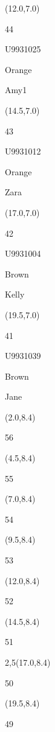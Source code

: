 \documentclass[a4paper]{article}
\newcommand{\myseat}[4]{%
\vspace{-0.1cm} \hspace{-0.5cm}
\parbox[t][2.2cm][t]{3.5cm}{%
\small #1 %
\begin{description}
\vspace{-0.1cm}
\item [ID:] #2
\vspace{-0.1cm}
\item [Team:] #3 \normalsize
\vspace{-0.1cm}
\item \normalsize #4
\vspace{-0.1cm}
\end{description}
}
}
\begin{document}
\begin{textblock}{2.5}(12.0,7.0)
\myseat{44}{U9931025}{Orange}{Amy1}
\end{textblock}

\begin{textblock}{2.5}(14.5,7.0)
\myseat{43}{U9931012}{Orange}{Zara}
\end{textblock}

\begin{textblock}{2.5}(17.0,7.0)
\myseat{42}{U9931004}{Brown}{Kelly}
\end{textblock}

\begin{textblock}{2.5}(19.5,7.0)
\myseat{41}{U9931039}{Brown}{Jane}
\end{textblock}


\begin{textblock}{2.5}(2.0,8.4)
\textblockcolor{}
\myseat{56}{}{}{}
\end{textblock}

\begin{textblock}{2.5}(4.5,8.4)
\textblockcolor{}
\myseat{55}{}{}{}
\end{textblock}

\begin{textblock}{2.5}(7.0,8.4)
\textblockcolor{}
\myseat{54}{}{}{}
\end{textblock}

\begin{textblock}{2.5}(9.5,8.4)
\textblockcolor{}
\myseat{53}{}{}{}
\end{textblock}

\begin{textblock}{2.5}(12.0,8.4)
\textblockcolor{}
\myseat{52}{}{}{}
\end{textblock}

\begin{textblock}{2.5}(14.5,8.4)
\textblockcolor{}
\myseat{51}{}{}{}
\end{textblock}

\begin{textblock}{2,5}(17.0,8.4)
\textblockcolor{}
\myseat{50}{}{}{}
\end{textblock}

\begin{textblock}{2.5}(19.5,8.4)
\textblockcolor{}
\myseat{49}{}{}{}
\end{textblock}
\end{document}
